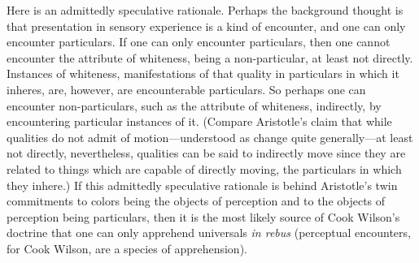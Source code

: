 Here is an admittedly speculative rationale. Perhaps the background thought is that presentation in sensory experience is a kind of encounter, and one can only encounter particulars. If one can only encounter particulars, then one cannot encounter the attribute of whiteness, being a non-particular, at least not directly. Instances of whiteness, manifestations of that quality in particulars in which it inheres, are, however, are encounterable particulars. So perhaps one can encounter non-particulars, such as the attribute of whiteness, indirectly, by encountering particular instances of it. (Compare Aristotle's claim that while qualities do not admit of motion---understood as change quite generally---at least not directly, nevertheless, qualities can be said to indirectly move since they are related to things which are capable of directly moving, the particulars in which they inhere.) If this admittedly speculative rationale is behind Aristotle's twin commitments to colors being the objects of perception and to the objects of perception being particulars, then it is the most likely source of Cook Wilson's \citeyearpar[336]{Cook-Wilson:1926sf} doctrine that one can only apprehend universals \emph{in rebus} (perceptual encounters, for Cook Wilson, are a species of apprehension).


